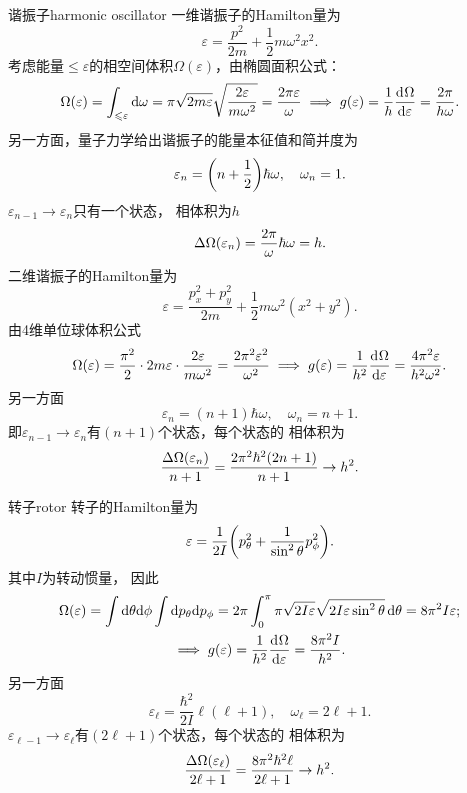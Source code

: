 \begin{example}{谐振子}{harmonic oscillator}
	一维谐振子的Hamilton量为
	\[
		\varepsilon=\frac{p^2}{2m}+\frac12m\omega^2x^2.
	\]
	考虑能量$\leq\varepsilon$的相空间体积$\Omega(\varepsilon)$，由椭圆面积公式：
	\begin{equation}
		\Omega(\varepsilon)=\int_{\leqslant\varepsilon}\mathop{}\!\mathrm{d}\omega=\pi\sqrt{2m\varepsilon}\sqrt{\frac{2\varepsilon}{m\omega^2}}=\frac{2\pi\varepsilon}\omega
		\implies
		g(\varepsilon)=\frac1h\frac{\mathrm{d}^{{}}\Omega}{\mathrm{d}{\varepsilon}^{{}}}=\frac{2\pi}{h\omega}.
	\end{equation}
	另一方面，量子力学给出谐振子的能量本征值和简并度为
	\[
		\varepsilon_n=\biggl(n+\frac12\biggr)\hbar\omega,\quad\omega_n=1.
	\]
	$\varepsilon_{n-1}\to\varepsilon_n$只有一个状态，
	相体积为$h$
	\[
		\Delta\Omega(\varepsilon_n)=\frac{2\pi}\omega\hbar\omega=h.
	\]
	\tcblower
	二维谐振子的Hamilton量为
	\[
		\varepsilon=\frac{p_x^2+p_y^2}{2m}+\frac12m\omega^2(x^2+y^2).
	\]
	由4维单位球体积公式
	\begin{equation}
		\Omega(\varepsilon)=\frac{\pi^2}2\cdot2m\varepsilon\cdot\frac{2\varepsilon}{m\omega^2}=\frac{2\pi^2\varepsilon^2}{\omega^2}
		\implies
		g(\varepsilon)=\frac1{h^2 }\frac{\mathrm{d}^{{}}\Omega}{\mathrm{d}{\varepsilon}^{{}}}=\frac{4\pi^2\varepsilon}{h^2\omega^2}.
	\end{equation}
	另一方面
	\[
		\varepsilon_n=(n+1)\hbar\omega,\quad\omega_n=n+1.
	\]
	即$\varepsilon_{n-1}\to\varepsilon_n$有$(n+1)$个状态，每个状态的
	相体积为
	\[
		\frac{\Delta\Omega(\varepsilon_n)}{n+1}=\frac{2\pi^2\hbar^2(2n+1)}{n+1}\to h^2.
	\]
\end{example}
\begin{example}{转子}{rotor}
	转子的Hamilton量为
	\[
		\varepsilon=\frac1{2I}\biggl(p_\theta^2+\frac1{\sin^2\theta}p_\phi^2\biggr).
	\]
	其中$I$为转动惯量，
	因此
	\begin{gather}\notag
		\Omega(\varepsilon)=\int\mathop{}\!\mathrm{d}\theta\mathrm{d}\phi\int\mathop{}\!\mathrm{d} p_\theta\mathrm{d} p_\phi=2\pi\int_0^\pi\pi\sqrt{2I\varepsilon}\sqrt{2I\varepsilon\sin^2\theta}\mathop{}\!\mathrm{d}\theta=8\pi^2I\varepsilon;\\
		\implies
		g(\varepsilon)=\frac1{h^2}\frac{\mathrm{d}^{{}}\Omega}{\mathrm{d}{\varepsilon}^{{}}}=\frac{8\pi^2I}{h^2}.
	\end{gather}
	另一方面
	\[
		\varepsilon_\ell=\frac{\hbar^2}{2I}\ell(\ell+1),\quad\omega_\ell=2\ell+1.
	\]
	$\varepsilon_{\ell-1}\to\varepsilon_\ell$有$(2\ell+1)$个状态，每个状态的
	相体积为
	\[
		\frac{\Delta\Omega(\varepsilon_\ell)}{2\ell+1}=\frac{8\pi^2\hbar^2\ell}{2\ell+1}\to h^2.
	\]
\end{example}
